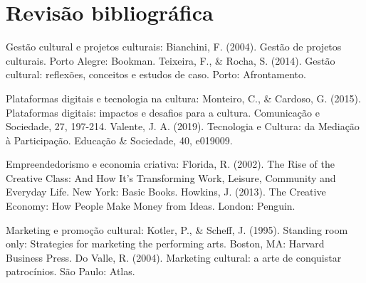 \chapter{Revisão bibliográfica}
\label{cap:revisao}

    Gestão cultural e projetos culturais:
        Bianchini, F. (2004). Gestão de projetos culturais. Porto Alegre: Bookman.
        Teixeira, F., & Rocha, S. (2014). Gestão cultural: reflexões, conceitos e estudos de caso. Porto: Afrontamento.

    Plataformas digitais e tecnologia na cultura:
        Monteiro, C., & Cardoso, G. (2015). Plataformas digitais: impactos e desafios para a cultura. Comunicação e Sociedade, 27, 197-214.
        Valente, J. A. (2019). Tecnologia e Cultura: da Mediação à Participação. Educação & Sociedade, 40, e019009.

    Empreendedorismo e economia criativa:
        Florida, R. (2002). The Rise of the Creative Class: And How It's Transforming Work, Leisure, Community and Everyday Life. New York: Basic Books.
        Howkins, J. (2013). The Creative Economy: How People Make Money from Ideas. London: Penguin.

    Marketing e promoção cultural:
        Kotler, P., & Scheff, J. (1995). Standing room only: Strategies for marketing the performing arts. Boston, MA: Harvard Business Press.
        Do Valle, R. (2004). Marketing cultural: a arte de conquistar patrocínios. São Paulo: Atlas.
